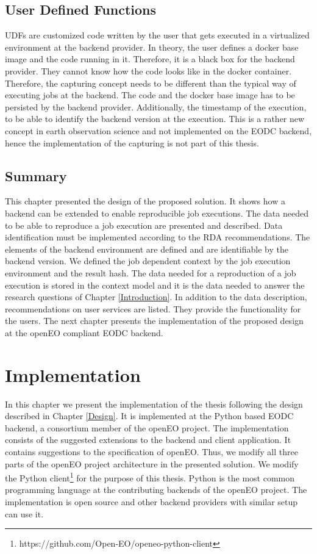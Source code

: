 \documentclass[draft,final]{vutinfth} %
\newcommand{\bgoesswein}[1]{{\color{blue}#1}}
\begin{document}
\section{User Defined Functions}\label{Design:User Defined Functions}
UDFs are customized code written by the user that gets executed in a virtualized environment at the backend provider. In theory, the user defines a docker base image and the code running in it. Therefore, it is a black box for the backend provider. They \bgoesswein{cannot} know how the code looks like in the docker container. Therefore, the capturing concept needs to be different than the typical way of executing jobs at the backend. The code and the docker base image has to be persisted by the backend provider. Additionally, the timestamp of the execution, to be able to identify the backend version at the execution. This is a rather new concept in earth observation science and not implemented on the EODC backend, hence the implementation of the capturing is not part of this thesis.

\section{Summary}
This chapter presented the design of the proposed solution. It shows how a backend can be extended to enable reproducible job executions. The data needed to be able to reproduce a job execution are presented and described. Data identification must be implemented according to the RDA recommendations. The elements of the backend environment are defined and are identifiable by the backend version. We defined the job dependent context by the job execution environment and the result hash. The data needed for a reproduction of a job execution is stored in the context model and it is the data needed to answer the research questions of Chapter \ref{Introduction}. In addition to the data description, recommendations on user services are listed. They provide the functionality for the users. The next chapter presents the implementation of the proposed design at the openEO compliant EODC backend.    

\chapter{Implementation}\label{Implementation}

In this chapter we present the \bgoesswein{implementation} of the thesis following the design described in Chapter \ref{Design}. It is implemented at the Python based EODC backend, a consortium member of the openEO project. The implementation consists of the suggested extensions to the backend and client application. It contains suggestions to the specification of openEO. Thus, we modify all three parts of the openEO project architecture in the presented solution. We modify the Python client\footnote{https://github.com/Open-EO/openeo-python-client} for the purpose of this thesis.  Python is the most common programming language at the contributing backends of the openEO project. The implementation is open source and other backend providers with similar setup can use it.  
\end{document}
